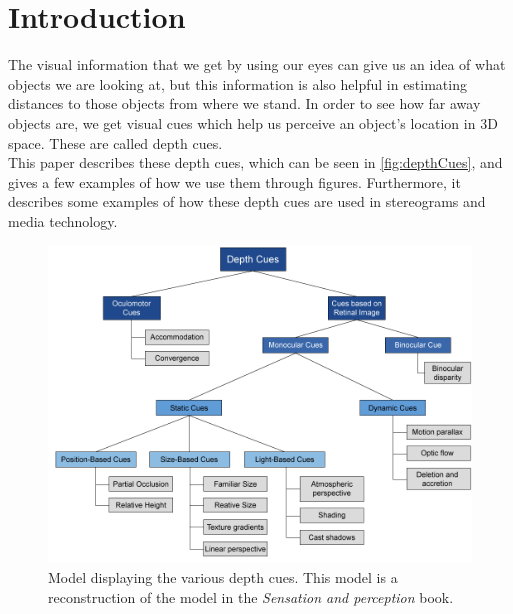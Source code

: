 \section{Introduction}

The visual information that we get by using our eyes can give us an idea of what objects we are looking at, but this information is also helpful in estimating distances to those objects from where we stand. In order to see how far away objects are, we get visual cues which help us perceive an object's location in 3D space. These are called depth cues\citep[p.~195]{sensationPerception}.\\
This paper describes these depth cues, which can be seen in \autoref{fig:depthCues}, and gives a few examples of how we use them through figures. Furthermore, it describes some examples of how these depth cues are used in stereograms and media technology.

\begin{figure}[H]
	\centering
	\includegraphics[width=1\linewidth]{figure/Analysis/depthCues.png}
	\caption{Model displaying the various depth cues. This model is a reconstruction of the model in the \textit{Sensation and perception} book\citep[p.~195]{sensationPerception}.}
	\label{fig:depthCues}
\end{figure}